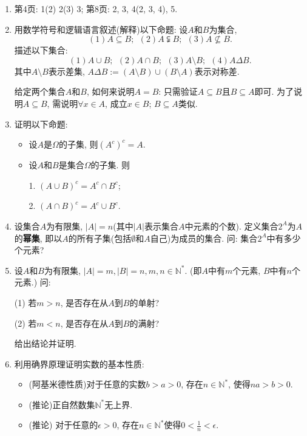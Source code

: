 \documentclass[UTF8,11pt, a4paper, oneside, fontset=none]{ctexbook}
\begin{document}
\begin{enumerate}
\item  第4页: 1(2) 2(3) 3; 第8页: 2, 3, 4(2, 3, 4), 5.
\item 用数学符号和逻辑语言叙述(解释)以下命题: 设$A$和$B$为集合, 
\[
(1) A \subseteq B; \ \ (2) A \subsetneqq B; \ \ (3) A \nsubseteq B.
\]
描述以下集合:
\[
(1) A \cup B; \ \ (2) A \cap B; \ \ (3) A \setminus B; \ \ (4) A \Delta B.
\]
其中$A \setminus B$表示差集, $A \Delta B := (A \setminus B) \cup (B \setminus A)$表示对称差. 

\begin{tcolorbox}[title=注记, colback=white]
给定两个集合$A$和$B$, 如何来说明$A = B$: 只需验证$A \subseteq B$且$B \subseteq A$即可. 为了说明$A \subseteq B$, 需说明$\forall x \in A$, 成立$x \in B$; $B \subseteq A$类似.
\end{tcolorbox}


\item 证明以下命题:
\begin{itemize}
\item[(a)] 设$A$是$\Omega$的子集, 则$(A^c)^c = A$.
\item[(b)] 设$A$和$B$是集合$\Omega$的子集. 则

1. $(A \cup B)^c = A^c \cap B^c$;

2. $(A \cap B)^c = A^c \cup B^c$.
\end{itemize}

\item 设集合$A$为有限集, $|A| = n$(其中$|A|$表示集合$A$中元素的个数). 定义集合$2^A$为$A$的{\bf 幂集}, 即以$A$的所有子集(包括$\emptyset$和$A$自己)为成员的集合. 问: 集合$2^A$中有多少个元素? 

\item 设$A$和$B$为有限集, $|A| =m, |B| =n, m, n \in \mathbb N^*$. (即$A$中有$m$个元素, $B$中有$n$个元素.) 问: 

(1) 若$m>n$, 是否存在从$A$到$B$的单射?

(2) 若$m < n$, 是否存在从$A$到$B$的满射?

给出结论并证明. 

\item 利用确界原理证明实数的基本性质: 
\begin{itemize}
\item[(a)] (阿基米德性质)对于任意的实数$b>a>0$, 存在$n \in \mathbb N^*$, 使得$na>b>0$.
\item[(b)] (推论)正自然数集$\mathbb N^*$无上界.
\item[(c)] (推论) 对于任意的$\epsilon>0$, 存在$n \in \mathbb N^*$使得$0 < \frac{1}{n} < \epsilon$.
\end{itemize}



\end{enumerate}
\end{document}

